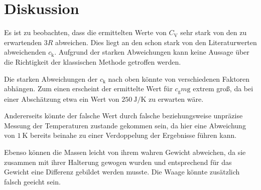 
\section{Diskussion}
\label{sec:Diskussion}

Es ist zu beobachten, dass die ermittelten Werte von $C_\text{V}$ sehr stark von den zu erwartenden $3R$ abweichen. Dies liegt an den schon stark von den Literaturwerten abweichenden $c_\text{k}$. Aufgrund der starken Abweichungen kann keine Aussage über die Richtigkeit der klassischen Methode getroffen werden. 

Die starken Abweichungen der $c_\text{k}$ nach oben könnte von verschiedenen Faktoren abhängen. Zum einen erscheint der ermittelte Wert für $c_\text{g}m\text{g}$ extrem groß, da bei einer Abschätzung etwa ein Wert von $\SI{250}{\joule\per\kelvin}$ zu erwarten wäre.

Andererseits könnte der falsche Wert durch falsche beziehungsweise unpräzise Messung der Temperaturen zustande gekommen sein, da hier eine Abweichung von $\SI{1}{\kelvin}$ bereits beinahe zu einer Verdoppelung der Ergebnisse führen kann.

Ebenso können die Massen leicht von ihrem wahren Gewicht abweichen, da sie zusammen mit ihrer Halterung gewogen wurden und entsprechend für das Gewicht eine Differenz gebildet werden musste. Die Waage könnte zusätzlich falsch geeicht sein. 

  